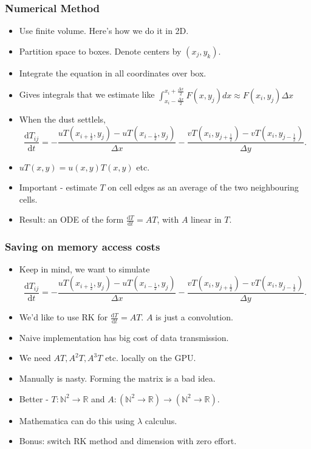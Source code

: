 \documentclass[]{beamer}
\newcommand{\der}{\text{d}}
\begin{document}
\begin{frame}
  \frametitle{Numerical Method}   %

  \begin{itemize}
  \item Use finite volume. Here's how we do it in 2D.
  \item Partition space to boxes. Denote centers by $(x_j, y_k)$. 
  \item Integrate the equation in all coordinates over box.
  \item Gives integrals that we estimate like $\int_{x_i - \frac{\Delta x}{2}}^{x_i + \frac{\Delta x}{2}} F(x,y_j) dx \approx F(x_i ,y_j)\Delta x$
  \item When the dust settlels, 
  $$
  \frac{\der T_{ij}}{\der t} = -\frac{uT(x_{i+\frac{1}{2}} , y_j) - uT(x_{i-\frac{1}{2}} , y_j)}{\Delta x} -\frac{vT(x_i , y_{j+\frac{1}{2}}) - vT(x_i , y_{j-\frac{1}{2}})}{\Delta y}.
  $$  
  \item $uT(x,y) = u(x,y) T(x,y)$ etc.
  \item Important - estimate $T$ on cell edges as an average of the two neighbouring cells.
  \item Result: an ODE of the form $\frac{\der T}{\der t} = AT$, with $A$ linear in $T$.
  \end{itemize}
\end{frame}

\begin{frame}
  \frametitle{Saving on memory access costs}   %

  \begin{itemize}
\item Keep in mind, we want to simulate
  $$
  \frac{\der T_{ij}}{\der t} = -\frac{uT(x_{i+\frac{1}{2}} , y_j) - uT(x_{i-\frac{1}{2}} , y_j)}{\Delta x} -\frac{vT(x_i , y_{j+\frac{1}{2}}) - vT(x_i , y_{j-\frac{1}{2}})}{\Delta y}.
  $$  
  \item We'd like to use RK for $\frac{\der T}{\der t} = AT$. $A$ is just a convolution.
  \item Naive implementation has big cost of data transmission.
  \item We need $AT, A^2T, A^3T$ etc. locally on the GPU.
  \item Manually is nasty. Forming the matrix is a bad idea.
  \item Better - $T: \mathbb{N}^2 \to \mathbb{R}$ and $A:(\mathbb{N}^2 \to \mathbb{R}) \to (\mathbb{N}^2 \to \mathbb{R})$.  
  \item Mathematica can do this using $\lambda$ calculus.
  \item Bonus: switch RK method and dimension with zero effort.
  \end{itemize}
\end{frame}
\end{document}
